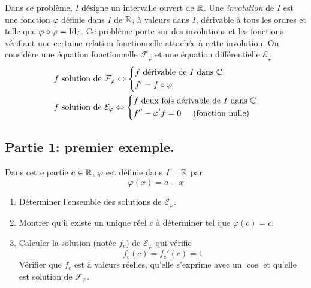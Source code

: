 Dans ce problème, $I$ désigne un intervalle ouvert de $\mathbb{R}$. Une \emph{involution} de $I$ est une fonction $\varphi$ définie dans $I$ de $\mathbb{R}$, à valeurs dans $I$, dérivable à tous les ordres et telle que $\varphi \circ \varphi = \operatorname{Id}_I$.\newline
Ce problème porte sur des involutions et les fonctions vérifiant une certaine relation fonctionnelle attachée à cette involution.\newline
On considère une équation fonctionnelle $\mathcal{F}_\varphi$ et une équation différentielle $\mathcal{E}_\varphi$
\begin{align*}
  &f \text{ solution de } \mathcal{F}_\varphi
\Leftrightarrow
\left\lbrace 
\begin{aligned}
  &f \text{ dérivable de $I$ dans $\mathbb{C}$}\\
  &f' = f \circ \varphi
\end{aligned}
\right. \\
  &f \text{ solution de } \mathcal{E}_\varphi
\Leftrightarrow
\left\lbrace 
\begin{aligned}
  &f \text{ deux fois dérivable de $I$ dans $\mathbb{C}$}\\
  &f'' -\varphi' f  = 0\hspace{0.5cm}\text{(fonction nulle)}
\end{aligned}
\right. 
\end{align*}

\subsection*{Partie 1: premier exemple.}
Dans cette partie $a\in \mathbb{R}$, $\varphi$ est définie dans $I=\mathbb{R}$ par
\begin{displaymath}
  \varphi(x) = a - x
\end{displaymath}
\begin{enumerate}
  \item Déterminer l'ensemble des solutions de $\mathcal{E}_\varphi$.
  \item Montrer qu'il existe un unique réel $c$ à déterminer tel que $\varphi(c) = c$.
  \item Calculer la solution (notée $f_c$) de $\mathcal{E}_\varphi$ qui vérifie
  \begin{displaymath}
    f_c(c) = f_c'(c) = 1
  \end{displaymath}
Vérifier que  $f_c$ est à valeurs réelles, qu'elle s'exprime avec un $\cos$ et qu'elle est solution de $\mathcal{F}_\varphi$.
\end{enumerate}


